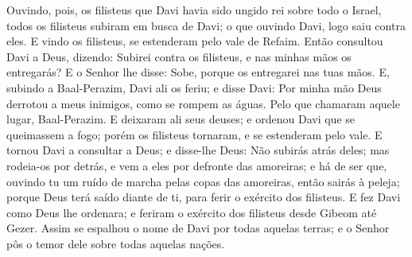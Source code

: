 Ouvindo, pois, os filisteus que Davi havia sido ungido rei sobre
todo o Israel, todos os filisteus subiram em busca de Davi; o que
ouvindo Davi, logo saiu contra eles. E vindo os filisteus, se
estenderam pelo vale de Refaim. Então consultou Davi a Deus,
dizendo: Subirei contra os filisteus, e nas minhas mãos os
entregarás? E o Senhor lhe disse: Sobe, porque os entregarei nas
tuas mãos. E, subindo a Baal-Perazim, Davi ali os feriu; e
disse Davi: Por minha mão Deus derrotou a meus inimigos, como se
rompem as águas. Pelo que chamaram aquele lugar, Baal-Perazim.
E deixaram ali seus deuses; e ordenou Davi que se queimassem
a fogo; porém os filisteus tornaram, e se estenderam pelo
vale. E tornou Davi a consultar a Deus; e disse-lhe Deus: Não
subirás atrás deles; mas rodeia-os por detrás, e vem a eles por
defronte das amoreiras; e há de ser que, ouvindo tu um ruído
de marcha pelas copas das amoreiras, então sairás à peleja; porque
Deus terá saído diante de ti, para ferir o exército dos filisteus.
E fez Davi como Deus lhe ordenara; e feriram o exército dos
filisteus desde Gibeom até Gezer. Assim se espalhou o nome de
Davi por todas aquelas terras; e o Senhor pôs o temor dele sobre
todas aquelas nações.

\medskip

